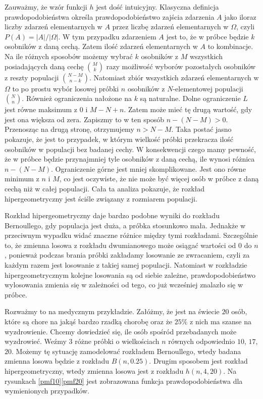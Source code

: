 Zauważmy, że wzór funkcji $h$ jest dość intuicyjny. Klasyczna definicja prawdopodobieństwa określa prawdopodobieństwo zajścia zdarzenia $A$ jako iloraz liczby zdarzeń elementarnych w $A$ przez liczbę zdarzeń elementarnych w $\Omega$, czyli $P(A) = |A|/|\Omega|$. W tym przypadku zdarzeniem $A$ jest to, że w próbce będzie $k$ osobników z daną cechą. Zatem ilość zdarzeń elementarnych w $A$ to kombinacje. Na ile różnych sposobów możemy wybrać $k$ osobników z $M$ wszystkich posiadających daną cechę $\binom{M}{k}$ razy możliwość wyborów pozostałych osobników z reszty populacji $\binom{N-M}{n-k}$. Natomiast zbiór wszystkich zdarzeń elementarnych w $\Omega$ to po prostu wybór losowej próbki $n$ osobników z $N$-elementowej populacji $\binom{N}{n}$. Również ograniczenia nałożone na $k$ są naturalne. Dolne ograniczenie $L$ jest równe maksimum z $0$ i $M-N+n$. Zatem może mieć tę drugą wartość, gdy jest ona większa od zera. Zapiszmy to w ten sposób $n-(N-M)>0$. Przenosząc na drugą stronę, otrzymujemy $n>N-M$. Taka postać jasno pokazuje, że jest to przypadek, w którym wielkość próbki przekracza ilość osobników w populacji bez badanej cechy. W konsekwencji czego mamy pewność, że w próbce będzie przynajmniej tyle osobników z daną cechą, ile wynosi różnica $n-(N-M)$. Ograniczenie górne jest mniej skomplikowane. Jest ono równe minimum z $n$ i $M$, co jest oczywiste, że nie może być więcej osób w próbce z daną cechą niż w całej populacji. Cała ta analiza pokazuje, że rozkład hipergeometryczny jest ściśle związany z rozmiarem populacji.

Rozkład hipergeometryczny daje bardzo podobne wyniki do rozkładu Bernoullego, gdy populacja jest duża, a próbka stosunkowo mała. Jednakże w przeciwnym wypadku widać znaczne różnice między tymi rozkładami. Szczególnie to, że zmienna losowa z rozkładu dwumianowego może osiągać wartości od $0$ do $n$, ponieważ podczas brania próbki zakładamy losowanie ze zwracaniem, czyli za każdym razem jest losowanie z takiej samej populacji. Natomiast w rozkładzie hipergeometrycznym kolejne losowania są od siebie zależne, prawdopodobieństwo wylosowania zmienia się w zależności od tego, co już wcześniej znalazło się w próbce.

Rozważmy to na medycznym przykładzie. Załóżmy, że jest na świecie $20$ osób, które są chore na jakąś bardzo rzadką chorobę oraz że $25\%$ z nich ma szanse na wyzdrowienie. Chcemy dowiedzieć się, ile osób spośród przebadanych może wyzdrowieć. Weźmy $3$ różne próbki o wielkościach $n$ równych odpowiednio $10$, $17$, $20$. Możemy tę sytuację zamodelować rozkładem Bernoullego, wtedy badana zmienna losowa będzie z rozkładu $B(n,0.25)$. Drugim sposobem jest rozkład hipergeometryczny, wtedy zmienna losowa jest z rozkładu $h(n,4,20)$. Na rysunkach \ref{pmf10}\dywiz \ref{pmf20} jest zobrazowana funkcja prawdopodobieństwa dla wymienionych przypadków.

